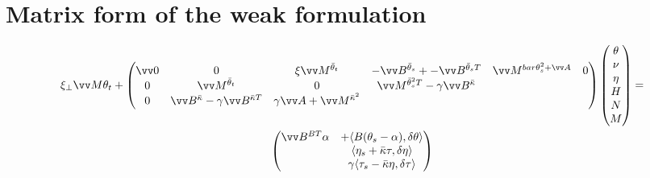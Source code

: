 

\section{Matrix form of the weak
formulation}\label{matrix-form-of-the-weak-formulation}

\begin{multline}
\label{eq:7}
\xi_\perp\vv M \theta_t + 
\begin{pmatrix}
\vv 0 & 0 & \xi\par \vv M^{\bar{\theta}_t} & -\vv B^{\bar{\theta}_s} + -\vv B^{\bar{\theta}_s T} & \vv M^{bar{\theta}^2_s +\vv A} & 0 \\
0 & \vv M^{\bar \theta_t} & 0 &
 \vv M^{\bar\theta^2_s T}
- \gamma\vv B^{\bar\kappa} \\
0 & 
 \vv B^{\bar\kappa}
- \gamma\vv B^{\bar\kappa T} 
&
%
%
\gamma \vv A
+ \vv M^{\bar \kappa^2}
\end{pmatrix}
%
\begin{pmatrix}
\theta\phantom{\big|\!\!}\\
\nu\phantom{\big|\!\!} \\
\eta\phantom{\big|\!\!}\\
H\phantom{\big|\!\!}\\
N\phantom{\big|\!\!}\\
M\phantom{\big|\!\!}
\end{pmatrix}
=\\
\begin{pmatrix}
\vv B^{BT}\alpha & +\langle B(\theta_s-\alpha), \delta \theta\rangle\\
& \langle \eta_s+\bar\kappa\tau,\delta\eta\rangle
\\
&\gamma\langle\tau_{s}-\bar \kappa\eta, \delta\tau\rangle 
\end{pmatrix}
\end{multline}


  